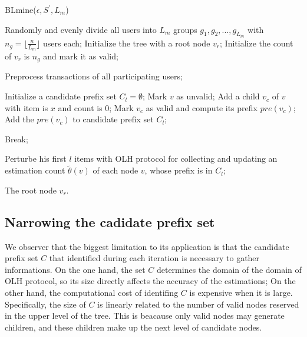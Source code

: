 \documentclass[conference]{IEEEtran}
\begin{document}
\begin{algorithm}[htbp]
  \caption{BLmine($\epsilon,S^{\prime},L_m$)}
  \label{alg BSmine}
  \begin{algorithmic}[1]
  \STATE Randomly and evenly divide all users into $L_m$ groups $g_1,g_2,...,g_{L_m}$ with $n_g = \lfloor \frac{n}{L_m} \rfloor$ users each;
  \STATE Initialize the tree with a root node $v_r$;
  \STATE Initialize the count of $v_r$ is $n_g$ and mark it as valid;

  \STATE Preprocess transactions of all participating users;

      \STATE Initialize a candidate prefix set $C_l = \emptyset$;
      \STATE Mark $v$ as unvalid;
        \STATE Add a child $v_c$ of $v$ with item is $x$ and count is 0;
        \STATE Mark $v_c$ as valid and compute its prefix $pre(v_c)$;
        \STATE Add the $pre(v_c)$ to candidate prefix set $C_l$;
      \ENDFOR
    \ENDWHILE
 
    \STATE Break;
    \ENDIF

    \STATE Perturbe his first $l$ items with OLH protocol for collecting and updating an estimation count $\tilde{\theta}(v)$ of each node $v$, whose prefix is in $C_l$;
    \ENDFOR

  \ENDFOR

  \RETURN The root node $v_r$.
  
  \end{algorithmic}
\end{algorithm}

\subsection{Narrowing the cadidate prefix set}
We observer that the biggest limitation to its application is that the candidate prefix set $C$ that identified during each iteration is necessary to gather informations. On the one hand, the set $C$ determines the domain of the domain of OLH protocol, so its size directly affects the accuracy of the estimations; On the other hand, the computational cost of identifing $C$ is expensive when it is large. Specifically, the size of $C$ is linearly related to the number of valid nodes reserved in the upper level of the tree. This is beacause only valid nodes may generate children, and these children make up the next level of candidate nodes.
\end{document}
